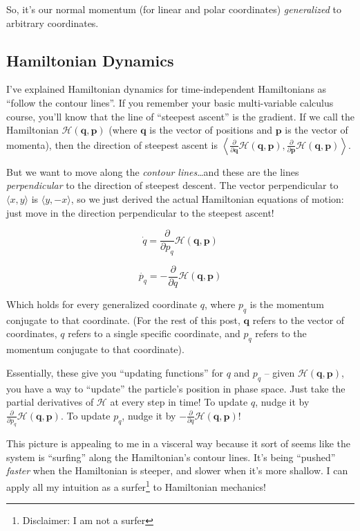 \documentclass[]{article}
\begin{document}
So, it's our normal momentum (for linear and polar coordinates)
\emph{generalized} to arbitrary coordinates.

\subsection{Hamiltonian Dynamics}\label{hamiltonian-dynamics}

I've explained Hamiltonian dynamics for time-independent Hamiltonians as
``follow the contour lines''. If you remember your basic multi-variable calculus
course, you'll know that the line of ``steepest ascent'' is the gradient. If we
call the Hamiltonian \(\mathcal{H}(\mathbf{q},\mathbf{p})\) (where
\(\mathbf{q}\) is the vector of positions and \(\mathbf{p}\) is the vector of
momenta), then the direction of steepest ascent is
\(\left \langle \frac{\partial}{\partial \mathbf{q}} \mathcal{H}(\mathbf{q},\mathbf{p}), \frac{\partial}{\partial \mathbf{p}} \mathcal{H}(\mathbf{q},\mathbf{p}) \right \rangle\).

But we want to move along the \emph{contour lines}\ldots{}and these are the
lines \emph{perpendicular} to the direction of steepest descent. The vector
perpendicular to \(\langle x, y \rangle\) is \(\langle y, -x \rangle\), so we
just derived the actual Hamiltonian equations of motion: just move in the
direction perpendicular to the steepest ascent!

\[
\dot{q} = \frac{\partial}{\partial p_q} \mathcal{H}(\mathbf{q},\mathbf{p})
\]

\[
\dot{p_q} = - \frac{\partial}{\partial q} \mathcal{H}(\mathbf{q},\mathbf{p})
\]

Which holds for every generalized coordinate \(q\), where \(p_q\) is the
momentum conjugate to that coordinate. (For the rest of this post,
\(\mathbf{q}\) refers to the vector of coordinates, \(q\) refers to a single
specific coordinate, and \(p_q\) refers to the momentum conjugate to that
coordinate).

Essentially, these give you ``updating functions'' for \(q\) and \(p_q\) --
given \(\mathcal{H}(\mathbf{q},\mathbf{p})\), you have a way to ``update'' the
particle's position in phase space. Just take the partial derivatives of
\(\mathcal{H}\) at every step in time! To update \(q\), nudge it by
\(\frac{\partial}{\partial p_q} \mathcal{H}(\mathbf{q},\mathbf{p})\). To update
\(p_q\), nudge it by
\(-\frac{\partial}{\partial q} \mathcal{H}(\mathbf{q},\mathbf{p})\)!

This picture is appealing to me in a visceral way because it sort of seems like
the system is ``surfing'' along the Hamiltonian's contour lines. It's being
``pushed'' \emph{faster} when the Hamiltonian is steeper, and slower when it's
more shallow. I can apply all my intuition as a surfer\footnote{Disclaimer: I am
  not a surfer} to Hamiltonian mechanics!
\end{document}
